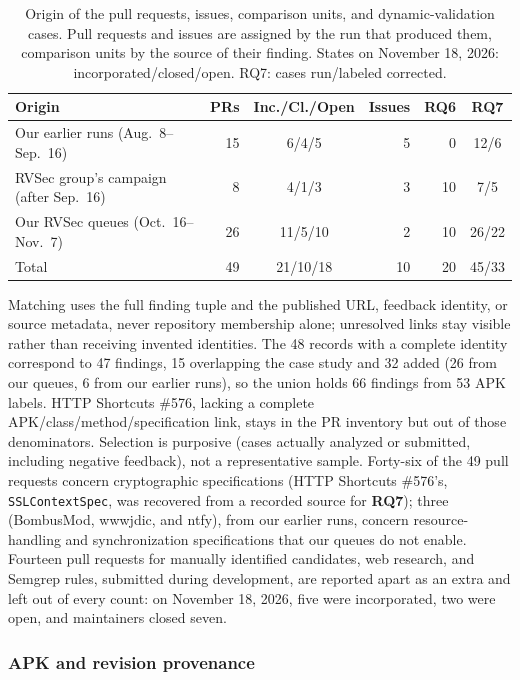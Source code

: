 \documentclass[conference]{IEEEtran}
\newcommand{\researchq}[1]{\textbf{RQ#1}}
\begin{document}
\begin{table}[H]
\centering
\caption{Origin of the pull requests, issues, comparison units, and
dynamic-validation cases. Pull requests and issues are assigned by the run
that produced them, comparison units by the source of their finding. States
on November 18, 2026: incorporated/closed/open. RQ7: cases run/labeled
corrected.}
\label{tab:origin}
\footnotesize
\setlength{\tabcolsep}{3pt}
\begin{tabular}{p{3.0cm}rcrrc}
\toprule
Origin & PRs & Inc./Cl./Open & Issues & RQ6 & RQ7 \\
\midrule
Our earlier runs (Aug.~8--Sep.~16) & 15 & 6/4/5 & 5 & 0 & 12/6 \\
RVSec group's campaign (after Sep.~16) & 8 & 4/1/3 & 3 & 10 & 7/5 \\
Our RVSec queues (Oct.~16--Nov.~7) & 26 & 11/5/10 & 2 & 10 & 26/22 \\
\midrule
Total & 49 & 21/10/18 & 10 & 20 & 45/33 \\
\bottomrule
\end{tabular}
\end{table}


Matching uses the full finding tuple and the published URL, feedback identity,
or source metadata, never repository membership alone; unresolved links stay
visible rather than receiving invented identities. The 48 records with a
complete identity correspond to 47 findings, 15 overlapping the case study and
32 added (26 from our queues, 6 from our earlier runs), so the union holds 66
findings from 53 APK labels. HTTP Shortcuts \#576,
lacking a complete APK/class/method/specification link, stays in the PR
inventory but out of those denominators. Selection is purposive (cases
actually analyzed or submitted, including negative feedback), not a
representative sample. Forty-six of the 49 pull requests concern
cryptographic specifications (HTTP Shortcuts \#576's, \texttt{SSLContextSpec},
was recovered from a recorded source for \researchq{7}); three (BombusMod,
wwwjdic, and ntfy), from our earlier runs, concern resource-handling and
synchronization specifications that our queues do not enable. Fourteen pull requests for manually
identified candidates, web research, and Semgrep rules, submitted during
development, are reported apart as an extra and left out of every count: on
November 18, 2026, five were incorporated, two were open, and maintainers
closed seven.

\subsubsection{APK and revision provenance}
\end{document}
